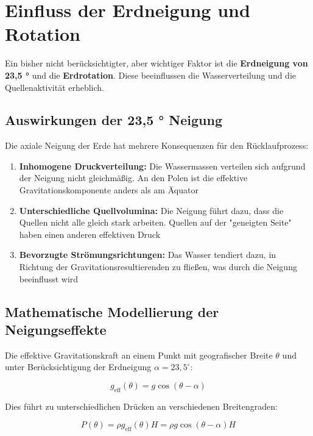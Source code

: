 ﻿\documentclass[12pt,a4paper]{report}
\begin{document}
\section{Einfluss der Erdneigung und Rotation}

Ein bisher nicht berücksichtigter, aber wichtiger Faktor ist die \textbf{Erdneigung von 23,5 °} und die \textbf{Erdrotation}. Diese beeinflussen die Wasserverteilung und die Quellenaktivität erheblich.

\subsection{Auswirkungen der 23,5 ° Neigung}

Die axiale Neigung der Erde hat mehrere Konsequenzen für den Rücklaufprozess:

\begin{enumerate}
	\item \textbf{Inhomogene Druckverteilung:} Die Wassermassen verteilen sich aufgrund der Neigung nicht gleichmäßig. An den Polen ist die effektive Gravitationskomponente anders als am Äquator
	
	\item \textbf{Unterschiedliche Quellvolumina:} Die Neigung führt dazu, dass die Quellen nicht alle gleich stark arbeiten. Quellen auf der "geneigten Seite" haben einen anderen effektiven Druck
	
	\item \textbf{Bevorzugte Strömungsrichtungen:} Das Wasser tendiert dazu, in Richtung der Gravitationsresultierenden zu fließen, was durch die Neigung beeinflusst wird
\end{enumerate}

\subsection{Mathematische Modellierung der Neigungseffekte}

Die effektive Gravitationskraft an einem Punkt mit geografischer Breite $\theta$ und unter Berücksichtigung der Erdneigung $\alpha = 23{,}5^\circ$:

\begin{equation}
	g_{\text{eff}}(\theta) = g \cos(\theta - \alpha)
\end{equation}

Dies führt zu unterschiedlichen Drücken an verschiedenen Breitengraden:

\begin{equation}
	P(\theta) = \rho g_{\text{eff}}(\theta) H = \rho g \cos(\theta - \alpha) H
\end{equation}
\end{document}
